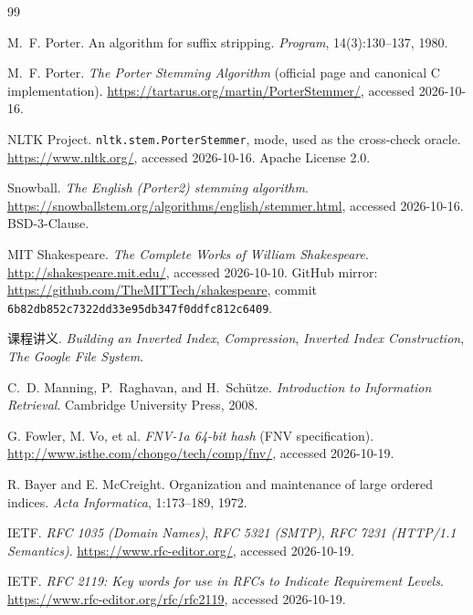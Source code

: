 \documentclass[UTF8,a4paper,12pt]{ctexrep}
\newcommand{\code}[1]{\texttt{\detokenize{#1}}}
\begin{document}
\begin{sloppypar}
\begin{thebibliography}{99}

M.~F. Porter.
\newblock An algorithm for suffix stripping.
\newblock \emph{Program}, 14(3):130--137, 1980.

M.~F. Porter.
\newblock \emph{The Porter Stemming Algorithm} (official page and canonical C
  implementation).
\newblock \url{https://tartarus.org/martin/PorterStemmer/}, accessed 2026-10-16.

NLTK Project.
\newblock \texttt{nltk.stem.PorterStemmer}, \code{MARTIN_EXTENSIONS} mode,
  used as the cross-check oracle.
\newblock \url{https://www.nltk.org/}, accessed 2026-10-16.
  Apache License 2.0.

Snowball.
\newblock \emph{The English (Porter2) stemming algorithm}.
\newblock \url{https://snowballstem.org/algorithms/english/stemmer.html},
  accessed 2026-10-16. BSD-3-Clause.

MIT Shakespeare.
\newblock \emph{The Complete Works of William Shakespeare}.
\newblock \url{http://shakespeare.mit.edu/}, accessed 2026-10-10.
  GitHub mirror: \url{https://github.com/TheMITTech/shakespeare},
  commit \texttt{6b82db852c7322dd33e95db347f0ddfc812c6409}.

课程讲义.
\newblock \emph{Building an Inverted Index}, \emph{Compression},
  \emph{Inverted Index Construction}, \emph{The Google File System}.

C.~D. Manning, P.~Raghavan, and H.~Sch\"utze.
\newblock \emph{Introduction to Information Retrieval}.
\newblock Cambridge University Press, 2008.

G. Fowler, M. Vo, et al.
\newblock \emph{FNV-1a 64-bit hash} (FNV specification).
\newblock \url{http://www.isthe.com/chongo/tech/comp/fnv/}, accessed 2026-10-19.

R. Bayer and E. McCreight.
\newblock Organization and maintenance of large ordered indices.
\newblock \emph{Acta Informatica}, 1:173--189, 1972.

IETF.
\newblock \emph{RFC 1035 (Domain Names)}, \emph{RFC 5321 (SMTP)},
  \emph{RFC 7231 (HTTP/1.1 Semantics)}.
\newblock \url{https://www.rfc-editor.org/}, accessed 2026-10-19.

IETF.
\newblock \emph{RFC 2119: Key words for use in RFCs to Indicate Requirement
  Levels}.
\newblock \url{https://www.rfc-editor.org/rfc/rfc2119}, accessed 2026-10-19.

\end{thebibliography}
\end{sloppypar}

\appendix

\end{document}

